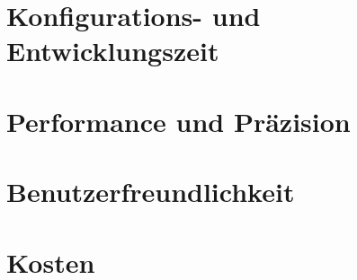 \section{Konfigurations- und Entwicklungszeit}
\section{Performance und Präzision}
\section{Benutzerfreundlichkeit}
\section{Kosten}